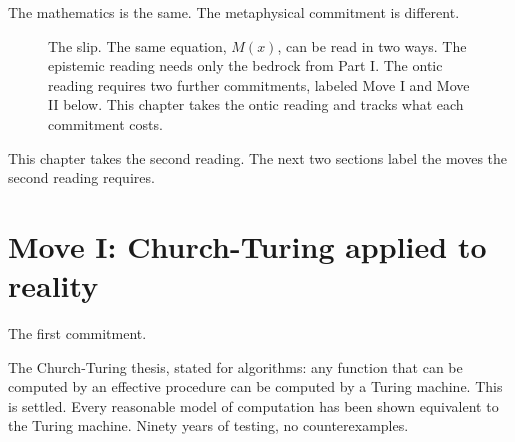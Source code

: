 The mathematics is the same. The metaphysical commitment is different.

\begin{figure}[h]
\centering
{}
\caption{The slip. The same equation, $M(x)$, can be read in two ways. The epistemic reading needs only the bedrock from Part I. The ontic reading requires two further commitments, labeled Move I and Move II below. This chapter takes the ontic reading and tracks what each commitment costs.}
\label{fig:slip}
\end{figure}

This chapter takes the second reading. The next two sections label the moves the second reading requires.

\section*{Move I: Church-Turing applied to reality}

The first commitment.

The Church-Turing thesis, stated for algorithms: any function that can be computed by an effective procedure can be computed by a Turing machine. This is settled. Every reasonable model of computation has been shown equivalent to the Turing machine. Ninety years of testing, no counterexamples.

